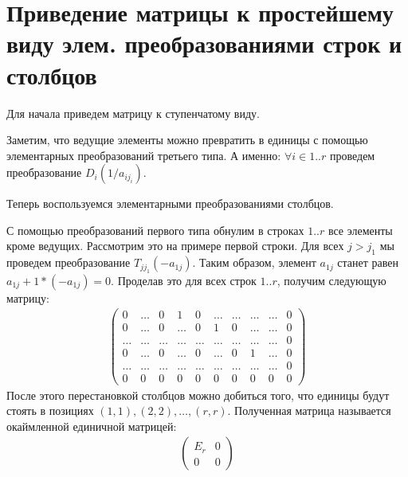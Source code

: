 \section{Приведение матрицы к простейшему виду элем. преобразованиями строк и столбцов}
Для начала приведем матрицу к ступенчатому виду. 

Заметим, что ведущие элементы можно превратить в единицы с помощью элементарных преобразований третьего типа.
А именно: $\forall i \in 1..r$ проведем преобразование $D_i(1 / a_{ij_i})$.

Теперь воспользуемся элементарными преобразованиями столбцов. 

С помощью преобразований первого типа обнулим в строках $1..r$ все элементы кроме ведущих.
Рассмотрим это на примере первой строки. 
Для всех $j > j_1$ мы проведем преобразование $T_{jj_1}(-a_{1j})$.
Таким образом, элемент $a_{1j}$ станет равен $a_{1j} + 1 * (-a_{1j}) = 0$. 
Проделав это для всех строк $1..r$, получим следующую матрицу:
\begin{gather*}
    \begin{pmatrix}
        0 & \dots & 0 & 1 & 0 & \dots & \dots & \dots & \dots & 0 \\
        0 & \dots & 0 & \dots & 0 & 1 & 0 & \dots & \dots & 0 \\
        \dots & \dots & \dots & \dots & \dots & \dots & \dots & \dots & \dots & 0 \\
        0 & \dots & 0 & \dots & 0 & \dots & 0 & 1 & \dots & 0 \\
        \dots & \dots & \dots & \dots & \dots & \dots & \dots & \dots & \dots & 0 \\
       0 & 0 & 0 & 0 & 0 & 0 & 0 & 0 & 0 & 0
    \end{pmatrix}
\end{gather*}
После этого перестановкой столбцов можно добиться того, что единицы будут стоять в позициях $(1, 1), (2, 2), \dots, (r, r)$.
Полученная матрица называется окаймленной единичной матрицей:
\begin{gather*}
    \begin{pmatrix}
        E_r & 0 \\
        0 & 0
    \end{pmatrix}
\end{gather*}